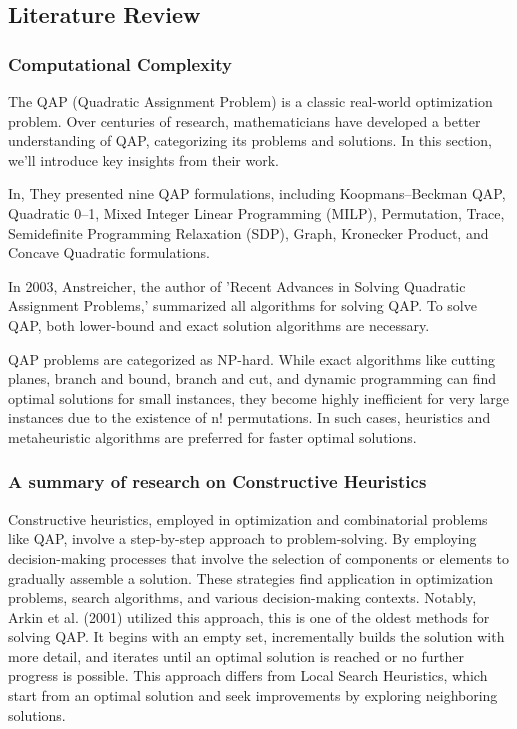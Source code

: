 \documentclass[a4paper,10pt]{article}
\begin{document}
\newpage
\subsection{Literature Review}

\subsubsection*{Computational Complexity }


The QAP (Quadratic Assignment Problem) is a classic real-world optimization problem. Over centuries of research, mathematicians have developed a better understanding of QAP, categorizing its problems and solutions. In this section, we'll introduce key insights from their work.


In\cite{article}, They presented nine QAP formulations, including Koopmans–Beckman QAP, Quadratic 0–1, Mixed Integer Linear Programming (MILP), Permutation, Trace, Semidefinite Programming Relaxation (SDP), Graph, Kronecker Product, and Concave Quadratic formulations.

In 2003, Anstreicher\cite{Anstreicher2003RecentAI}, the author of 'Recent Advances in Solving Quadratic Assignment Problems,' summarized all algorithms for solving QAP. To solve QAP, both lower-bound and exact solution algorithms are necessary.




QAP problems are categorized as NP-hard. While exact algorithms like cutting planes, branch and bound, branch and cut, and dynamic programming can find optimal solutions for small instances, they become highly inefficient for very large instances due to the existence of n! permutations. In such cases, heuristics and metaheuristic algorithms are preferred for faster optimal solutions.


\subsubsection*{A summary of research on Constructive Heuristics}

Constructive heuristics, employed in optimization and combinatorial problems like QAP, involve a step-by-step approach to problem-solving. By employing decision-making processes that involve the selection of components or elements to gradually assemble a solution. These strategies find application in optimization problems, search algorithms, and various decision-making contexts. Notably, Arkin et al. (2001) \cite{ARKIN200113} utilized this approach, this is one of the oldest methods for solving QAP. It begins with an empty set, incrementally builds the solution with more detail, and iterates until an optimal solution is reached or no further progress is possible. This approach differs from Local Search Heuristics, which start from an optimal solution and seek improvements by exploring neighboring solutions.
\end{document}
